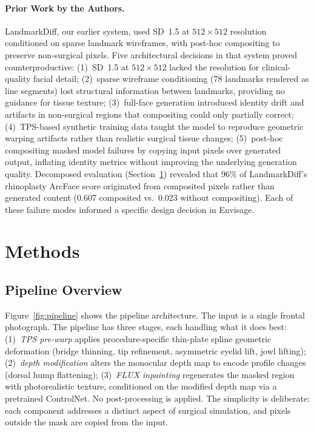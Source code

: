 \documentclass[twocolumn]{article}
\newcommand{\method}{Envisage}
\begin{document}
\paragraph{Prior Work by the Authors.}
LandmarkDiff, our earlier system, used SD~1.5 at $512 \times 512$ resolution
conditioned on sparse landmark wireframes, with post-hoc compositing to
preserve non-surgical pixels. Five architectural decisions in that system
proved counterproductive: (1)~SD~1.5 at $512 \times 512$ lacked the
resolution for clinical-quality facial detail; (2)~sparse wireframe
conditioning (78 landmarks rendered as line segments) lost structural
information between landmarks, providing no guidance for tissue texture;
(3)~full-face generation introduced identity drift and artifacts in
non-surgical regions that compositing could only partially correct;
(4)~TPS-based synthetic training data taught the model to reproduce
geometric warping artifacts rather than realistic surgical tissue changes;
(5)~post-hoc compositing masked model failures by copying input pixels over
generated output, inflating identity metrics without improving the
underlying generation quality. Decomposed evaluation (Section~\ref{sec:methods})
revealed that 96\% of LandmarkDiff's rhinoplasty ArcFace score originated from
composited pixels rather than generated content (0.607 composited vs.\
0.023 without compositing). Each of these failure modes informed a specific
design decision in \method{}.

\section{Methods}
\label{sec:methods}

\subsection{Pipeline Overview}

Figure~\ref{fig:pipeline} shows the pipeline architecture. The input is
a single frontal photograph. The pipeline has three stages, each
handling what it does best:
(1)~\emph{TPS pre-warp} applies procedure-specific thin-plate spline
geometric deformation (bridge thinning, tip refinement, asymmetric
eyelid lift, jowl lifting);
(2)~\emph{depth modification} alters the monocular depth map to encode
profile changes (dorsal hump flattening);
(3)~\emph{FLUX inpainting} regenerates the masked region with
photorealistic texture, conditioned on the modified depth map via a
pretrained ControlNet.
No post-processing is applied. The simplicity is deliberate: each
component addresses a distinct aspect of surgical simulation, and
pixels outside the mask are copied from the input.
\end{document}
